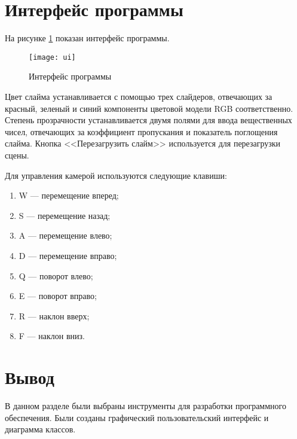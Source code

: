 \section{Интерфейс программы}

На рисунке \ref{ui} показан интерфейс программы.

\begin{figure}[h!]
	\centering
	\texttt{[image: ui]}
	\caption{Интерфейс программы}
	\label{ui}
\end{figure}

Цвет слайма устанавливается с помощью трех слайдеров, отвечающих за красный, зеленый и синий компоненты цветовой модели RGB соответственно. Степень прозрачности устанавливается двумя полями для ввода вещественных чисел, отвечающих за коэффициент пропускания и показатель поглощения слайма. Кнопка <<Перезагрузить слайм>> используется для перезагрузки сцены.

Для управления камерой используются следующие клавиши:

\begin{enumerate}
	\item W --- перемещение вперед;
	\item S --- перемещение назад;
	\item A --- перемещение влево;
	\item D --- перемещение вправо;
	\item Q --- поворот влево;
	\item E --- поворот вправо;
	\item R --- наклон вверх;
	\item F --- наклон вниз.
\end{enumerate}

\section*{Вывод}

В данном разделе были выбраны инструменты для разработки программного обеспечения. Были созданы графический пользовательский интерфейс и диаграмма классов.

\clearpage
